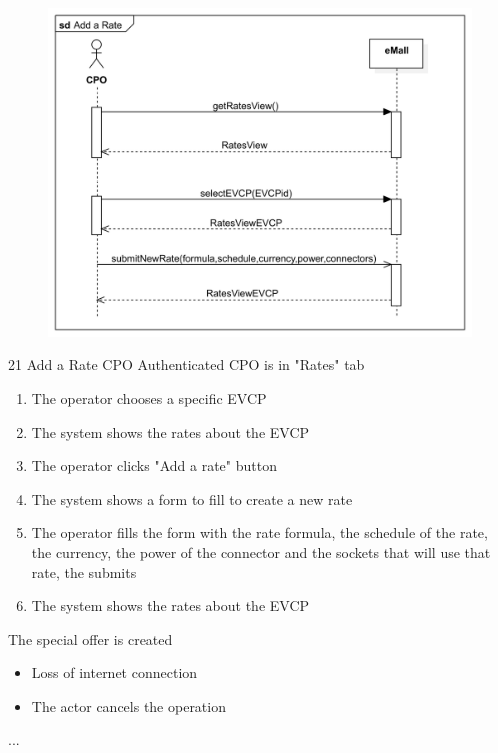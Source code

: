 \usecase
{
    \begin{figure}[H]
        \centering
        \includegraphics[scale=0.9]{src/sequence_diagram/addRate.png}
    \end{figure}
}
{21}
{Add a Rate} %
{CPO} %
{Authenticated CPO is in "Rates" tab} %
{ %
    \begin{enumerate}
        \item The operator chooses a specific EVCP
        \item The system shows the rates about the EVCP
        \item The operator clicks "Add a rate" button
        \item The system shows a form to fill to create a new rate
        \item The operator fills the form with the rate formula, the schedule of the rate, the currency, the power of the connector and the sockets that will use that rate, the submits
        \item The system shows the rates about the EVCP
    \end{enumerate}
}
{The special offer is created} %
{ %
    \begin{itemize}
        \item Loss of internet connection
        \item The actor cancels the operation
    \end{itemize}
}
{ %
    ...
}

\pagebreak


